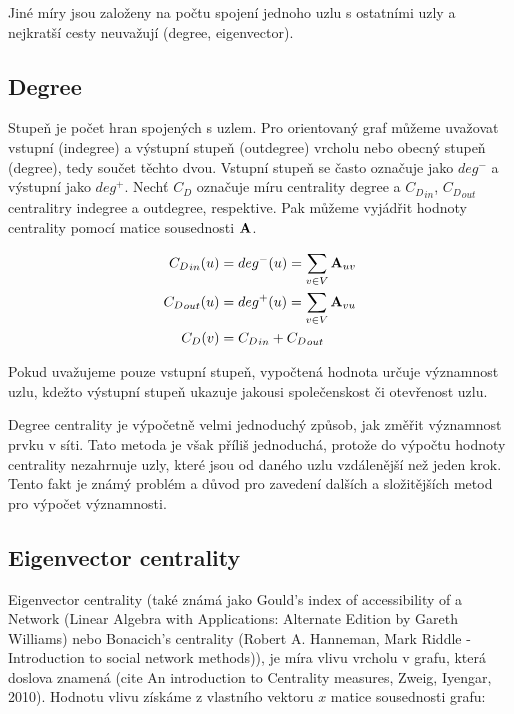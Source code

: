 \documentclass{bakalarka}
\begin{document}
Jiné míry jsou založeny na počtu spojení jednoho uzlu s ostatními uzly a
nejkratší cesty neuvažují (degree, eigenvector).


\subsection{Degree}
Stupeň je počet hran spojených s uzlem. Pro orientovaný graf můžeme uvažovat
vstupní (indegree) a výstupní stupeň (outdegree) vrcholu nebo obecný stupeň
(degree), tedy součet těchto dvou. Vstupní stupeň se často označuje jako
$deg^-$ a výstupní jako $deg^+$. Nechť $C_D$ označuje míru centrality degree a
${C_D}_{in}$, ${C_D}_{out}$ centralitry indegree a outdegree, respektive. Pak
můžeme vyjádřit hodnoty centrality pomocí matice sousednosti ${\bf A}$.

\begin{align}
\label{eq:degree}
{C_D}_{in}(u) &= deg^-(u)  = \displaystyle\sum\limits_{v \in V} {\bf A}_{uv} \\
{C_D}_{out}(u) &= deg^+(u) = \displaystyle\sum\limits_{v \in V} {\bf A}_{vu} \\
{C_D}(v) &= {C_D}_{in} + {C_D}_{out}
\end{align}

Pokud uvažujeme pouze vstupní stupeň, vypočtená hodnota určuje významnost uzlu,
kdežto výstupní stupeň ukazuje jakousi společenskost či otevřenost uzlu. 

Degree centrality je výpočetně velmi jednoduchý způsob, jak změřit významnost
prvku v síti. Tato metoda je však příliš jednoduchá, protože do výpočtu hodnoty
centrality nezahrnuje uzly, které jsou od daného uzlu vzdálenější než jeden
krok. Tento fakt je známý problém a důvod pro zavedení dalších a složitějších
metod pro výpočet významnosti.



\subsection{Eigenvector centrality}
Eigenvector centrality (také známá jako Gould's index of accessibility of a
Network (Linear Algebra with Applications: Alternate Edition by Gareth
Williams) nebo Bonacich's centrality (Robert A. Hanneman, Mark Riddle -
Introduction to social network methods)), je míra vlivu vrcholu v grafu, která
doslova znamená  (cite An introduction to
Centrality measures, Zweig, Iyengar, 2010). Hodnotu vlivu získáme z vlastního
vektoru $x$ matice sousednosti grafu:
\end{document}
